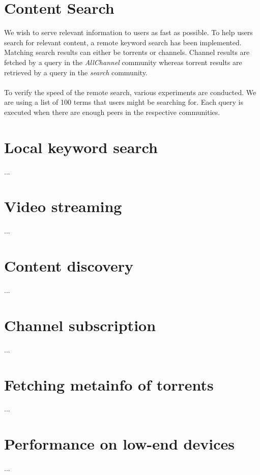 \section{Content Search}
We wish to serve relevant information to users as fast as possible. To help users search for relevant content, a remote keyword search has been implemented. Matching search results can either be torrents or channels. Channel results are fetched by a query in the \emph{AllChannel} community whereas torrent results are retrieved by a query in the \emph{search} community.\\\\
To verify the speed of the remote search, various experiments are conducted. We are using a list of 100 terms that users might be searching for. Each query is executed when there are enough peers in the respective communities.

\section{Local keyword search}
...

\section{Video streaming}
...

\section{Content discovery}
...

\section{Channel subscription}
...

\section{Fetching metainfo of torrents}
...

\section{Performance on low-end devices}
...